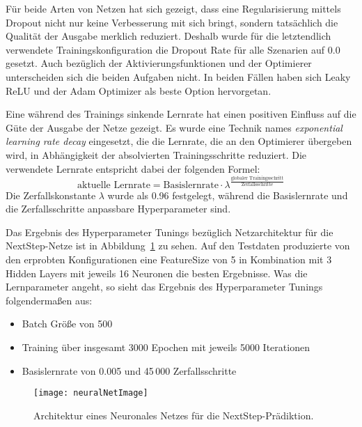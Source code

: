 Für beide Arten von Netzen hat sich gezeigt, dass eine Regularisierung mittels Dropout nicht nur keine Verbesserung mit sich bringt, sondern tatsächlich die Qualität der Ausgabe merklich reduziert.
Deshalb wurde für die letztendlich verwendete Trainingskonfiguration die Dropout Rate für alle Szenarien auf 0.0 gesetzt. 
Auch bezüglich der Aktivierungsfunktionen und der Optimierer unterscheiden sich die beiden Aufgaben nicht. 
In beiden Fällen haben sich Leaky ReLU und der Adam Optimizer als beste Option hervorgetan.

Eine während des Trainings sinkende Lernrate hat einen positiven Einfluss auf die Güte der Ausgabe der Netze gezeigt. 
Es wurde eine Technik names \textit{exponential learning rate decay} eingesetzt,
die die Lernrate, die an den Optimierer übergeben wird, in Abhängigkeit der absolvierten Trainingsschritte reduziert.   
Die verwendete Lernrate entspricht dabei der folgenden Formel:
\begin{equation*}
	\text{aktuelle Lernrate} = \text{Basislernrate} \cdot \lambda ^{\frac{\text{globaler Trainingsschritt}}{\text{Zerfallsschritte}}}
\end{equation*}
Die Zerfallskonstante \(\lambda\) wurde als 0.96 festgelegt, während die Basislernrate und die Zerfallsschritte anpassbare Hyperparameter sind.


Das Ergebnis des Hyperparameter Tunings bezüglich Netzarchitektur für die NextStep-Netze ist in Abbildung~\ref{fig:netArchitectureNextStep} zu sehen.
Auf den Testdaten produzierte von den erprobten Konfigurationen eine FeatureSize von 5 in Kombination mit 3 Hidden Layers mit jeweils 16 Neuronen die besten Ergebnisse.
Was die Lernparameter angeht, so sieht das Ergebnis des Hyperparameter Tunings folgendermaßen aus:
\begin{itemize}
    \item Batch Größe von 500
    \item Training über insgesamt 3000 Epochen mit jeweils 5000 Iterationen
    \item Basislernrate von 0.005 und 45\,000 Zerfallsschritte
\end{itemize}

\begin{figure}[h]
    \centering
	\texttt{[image: neuralNetImage]}
	\caption{Architektur eines Neuronales Netzes für die NextStep-Prädiktion.}
	\label{fig:netArchitectureNextStep}
\end{figure}

